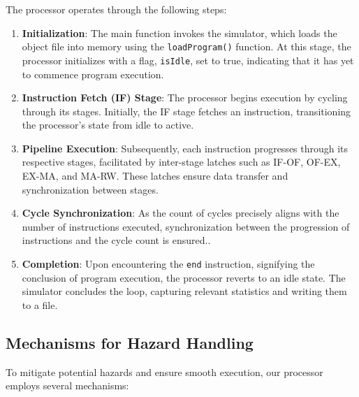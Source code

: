 \documentclass[12pt,a4paper]{article}
\begin{document}
The processor operates through the following steps:

\begin{enumerate}
    \item \textbf{Initialization}: The main function invokes the simulator, which loads the object file into memory using the \texttt{loadProgram()} function. At this stage, the processor initializes with a flag, \texttt{isIdle}, set to true, indicating that it has yet to commence program execution.
    
    \item \textbf{Instruction Fetch (IF) Stage}: The processor begins execution by cycling through its stages. Initially, the IF stage fetches an instruction, transitioning the processor's state from idle to active.
    
    \item \textbf{Pipeline Execution}: Subsequently, each instruction progresses through its respective stages, facilitated by inter-stage latches such as IF-OF, OF-EX, EX-MA, and MA-RW. These latches ensure data transfer and synchronization between stages.
    
    \item \textbf{Cycle Synchronization}: As the count of cycles precisely aligns with the number of instructions executed, synchronization between the progression of instructions and the cycle count is ensured..
    
    \item \textbf{Completion}: Upon encountering the \texttt{end} instruction, signifying the conclusion of program execution, the processor reverts to an idle state. The simulator concludes the loop, capturing relevant statistics and writing them to a file.
\end{enumerate}

\subsection{Mechanisms for Hazard Handling}

To mitigate potential hazards and ensure smooth execution, our processor employs several mechanisms:
\end{document}
